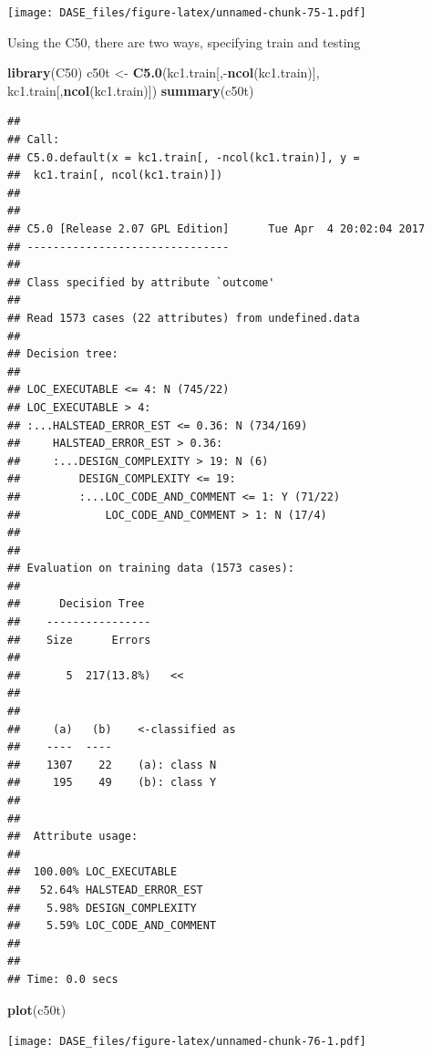 \documentclass[]{book}
\newenvironment{Shaded}{\begin{snugshade}}{\end{snugshade}}
\newcommand{\KeywordTok}[1]{\textcolor[rgb]{0.13,0.29,0.53}{\textbf{{#1}}}}
\newcommand{\StringTok}[1]{\textcolor[rgb]{0.31,0.60,0.02}{{#1}}}
\newcommand{\NormalTok}[1]{{#1}}
\begin{document}
\texttt{[image: DASE\_files/figure-latex/unnamed-chunk-75-1.pdf]}

Using the C50, there are two ways, specifying train and testing

\begin{Shaded}
\begin{Highlighting}[]
\KeywordTok{library}\NormalTok{(C50)}
\NormalTok{c50t <-}\StringTok{ }\KeywordTok{C5.0}\NormalTok{(kc1.train[,-}\KeywordTok{ncol}\NormalTok{(kc1.train)], kc1.train[,}\KeywordTok{ncol}\NormalTok{(kc1.train)])}
\KeywordTok{summary}\NormalTok{(c50t)}
\end{Highlighting}
\end{Shaded}

\begin{verbatim}
## 
## Call:
## C5.0.default(x = kc1.train[, -ncol(kc1.train)], y =
##  kc1.train[, ncol(kc1.train)])
## 
## 
## C5.0 [Release 2.07 GPL Edition]      Tue Apr  4 20:02:04 2017
## -------------------------------
## 
## Class specified by attribute `outcome'
## 
## Read 1573 cases (22 attributes) from undefined.data
## 
## Decision tree:
## 
## LOC_EXECUTABLE <= 4: N (745/22)
## LOC_EXECUTABLE > 4:
## :...HALSTEAD_ERROR_EST <= 0.36: N (734/169)
##     HALSTEAD_ERROR_EST > 0.36:
##     :...DESIGN_COMPLEXITY > 19: N (6)
##         DESIGN_COMPLEXITY <= 19:
##         :...LOC_CODE_AND_COMMENT <= 1: Y (71/22)
##             LOC_CODE_AND_COMMENT > 1: N (17/4)
## 
## 
## Evaluation on training data (1573 cases):
## 
##      Decision Tree   
##    ----------------  
##    Size      Errors  
## 
##       5  217(13.8%)   <<
## 
## 
##     (a)   (b)    <-classified as
##    ----  ----
##    1307    22    (a): class N
##     195    49    (b): class Y
## 
## 
##  Attribute usage:
## 
##  100.00% LOC_EXECUTABLE
##   52.64% HALSTEAD_ERROR_EST
##    5.98% DESIGN_COMPLEXITY
##    5.59% LOC_CODE_AND_COMMENT
## 
## 
## Time: 0.0 secs
\end{verbatim}

\begin{Shaded}
\begin{Highlighting}[]
\KeywordTok{plot}\NormalTok{(c50t)}
\end{Highlighting}
\end{Shaded}

\texttt{[image: DASE\_files/figure-latex/unnamed-chunk-76-1.pdf]}

\begin{Shaded}
\end{Shaded}
\end{document}
